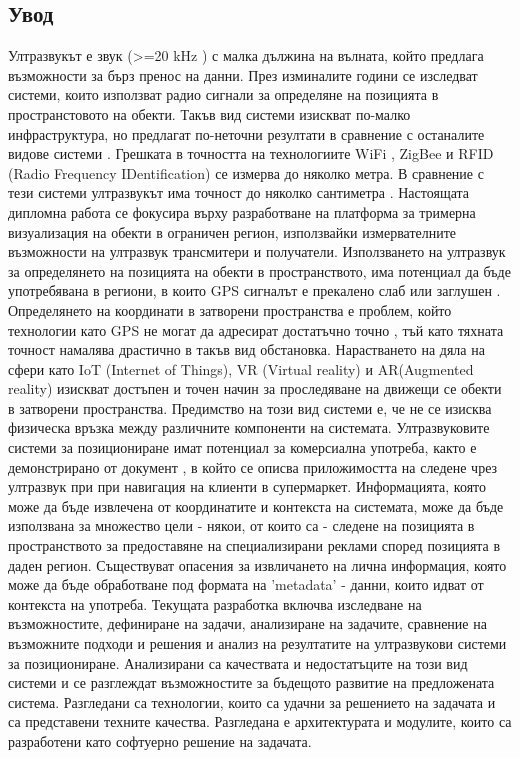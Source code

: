 \subsection{Увод}
\tab Ултразвукът е звук (>=20 kHz \cite{batmobile}) с малка дължина на вълната, който предлага възможности за бърз пренос на данни. През изминалите години се изследват системи, които използват радио сигнали за определяне на позицията в пространстовото на обекти. Такъв вид системи изискват по-малко инфраструктура, но предлагат по-неточни резултати в сравнение с останалите видове системи \cite{CarlosMedina}. Грешката в точността на технологиите WiFi \cite{wifi}, ZigBee \cite{zigbee} и RFID (Radio Frequency IDentification) \cite{rfid} се измерва до няколко метра. В сравнение с тези системи ултразвукът има точност до няколко сантиметра \cite{CarlosMedina} \cite{columbia}. Настоящата дипломна работа се фокусира върху разработване на платформа за тримерна визуализация на обекти в ограничен регион, използвайки измервателните възможности на ултразвук трансмитери и получатели. Използването на ултразвук за определянето на позицията на обекти в пространството, има потенциал да бъде употребявана в региони, в които GPS сигналът е прекалено слаб или заглушен \cite{yonei}. Определянето на координати в затворени пространства е проблем, който технологии като GPS не могат да адресират достатъчно точно \cite{gpsIsBadIndoor}, тъй като тяхната точност намалява драстично в такъв вид обстановка. Нарастването на дяла на сфери като IoT (Internet of Things), VR (Virtual reality) и AR(Augmented reality) изискват достъпен и точен начин за проследяване на движещи се обекти в затворени пространства. Предимство на този вид системи е, че не се изисква физическа връзка между различните компоненти на системата. Ултразвуковите системи за позициониране имат потенциал за комерсиална употреба, както е демонстрирано от документ \cite{batmobile}, в който се описва приложимостта на следене чрез ултразвук при при навигация на клиенти в супермаркет. Информацията, която може да бъде извлечена от координатите и контекста на системата, може да бъде използвана за множество цели - някои, от които са - следене на позицията в пространството за предоставяне на специализирани реклами според позицията в даден регион. Съществуват опасения за извличането на лична информация, която може да бъде обработване под формата на 'metadata' - данни, които идват от контекста на употреба. Текущата разработка включва изследване на възможностите, дефиниране на задачи, анализиране на задачите, сравнение на възможните подходи и решения и анализ на резултатите на ултразвукови системи за позициониране. Анализирани са качествата и недостатъците на този вид системи и се разглеждат възможностите за бъдещото развитие на предложената система. Разгледани са технологии, които са удачни за решението на задачата и са представени техните качества. Разгледана е архитектурата и модулите, които са разработени като софтуерно решение на задачата. 

